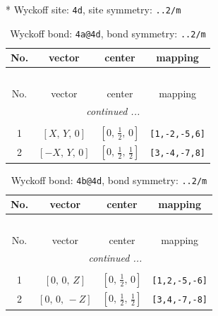 \documentclass[fleqn,8pt]{jsarticle}
\begin{document}
* Wyckoff site: {\tt 4d}, site symmetry: {\tt ..2/m}
\renewcommand{\arraystretch}{1.2}
\begin{longtable}{cccc}
\caption{Wyckoff bond: {\tt 4a@4d}, bond symmetry: {\tt ..2/m}}
 \\
 \hline \hline
No. & vector & center & mapping \\ \hline \endfirsthead

\multicolumn{3}{l}{\tablename\ \thetable{}} \\
 \hline \hline
No. & vector & center & mapping \\ \hline \endhead

 \hline \hline
\multicolumn{3}{r}{\footnotesize\it continued ...} \\ \endfoot

 \hline \hline
\multicolumn{3}{r}{} \\ \endlastfoot

1 & $\left[ X,\, Y,\, 0 \right]$ & $\left[ 0,\, \frac{1}{2},\, 0 \right]$ & {\tt [1,-2,-5,6]} \\ \hline
2 & $\left[ - X,\, Y,\, 0 \right]$ & $\left[ 0,\, \frac{1}{2},\, \frac{1}{2} \right]$ & {\tt [3,-4,-7,8]} \\
\end{longtable}
\renewcommand{\arraystretch}{1.2}
\begin{longtable}{cccc}
\caption{Wyckoff bond: {\tt 4b@4d}, bond symmetry: {\tt ..2/m}}
 \\
 \hline \hline
No. & vector & center & mapping \\ \hline \endfirsthead

\multicolumn{3}{l}{\tablename\ \thetable{}} \\
 \hline \hline
No. & vector & center & mapping \\ \hline \endhead

 \hline \hline
\multicolumn{3}{r}{\footnotesize\it continued ...} \\ \endfoot

 \hline \hline
\multicolumn{3}{r}{} \\ \endlastfoot

1 & $\left[ 0,\, 0,\, Z \right]$ & $\left[ 0,\, \frac{1}{2},\, 0 \right]$ & {\tt [1,2,-5,-6]} \\ \hline
2 & $\left[ 0,\, 0,\, - Z \right]$ & $\left[ 0,\, \frac{1}{2},\, \frac{1}{2} \right]$ & {\tt [3,4,-7,-8]} \\
\end{longtable}
\renewcommand{\arraystretch}{1.2}
\end{document}
